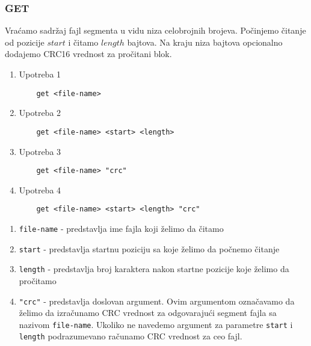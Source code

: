 \documentclass[a4paper]{extarticle}
\begin{document}
\subsubsection{GET}
\label{getLabel1}
Vraćamo sadržaj fajl segmenta u vidu niza celobrojnih brojeva.
Počinjemo čitanje od pozicije $start$ i čitamo $length$ bajtova. Na kraju niza bajtova opcionalno dodajemo CRC16 vrednost
za pročitani blok.\\


\begin{enumerate}
	\item Upotreba 1
	\begin{verbatim}
	get <file-name> 
	\end{verbatim}
	\item Upotreba 2
	\begin{verbatim}
	get <file-name> <start> <length>
	\end{verbatim}
	\item Upotreba 3
	\begin{verbatim}
	get <file-name> "crc"
	\end{verbatim}
	\item Upotreba 4
	\begin{verbatim}
	get <file-name> <start> <length> "crc"
	\end{verbatim}
\end{enumerate}


\begin{enumerate}
	\item \verb|file-name| - predstavlja ime fajla koji želimo da čitamo
	\item \verb|start| - predstavlja startnu poziciju sa koje želimo da počnemo čitanje
	\item \verb|length| - predstavlja broj karaktera nakon startne pozicije koje želimo da pročitamo
	\item \verb|"crc"| - predstavlja doslovan argument. Ovim argumentom označavamo da želimo da izračunamo CRC vrednost za odgovarajući segment fajla sa nazivom \verb|file-name|.  Ukoliko ne navedemo argument za parametre \verb|start| i \verb|length| podrazumevano računamo CRC vrednost za ceo fajl.
\end{enumerate}
\end{document}
